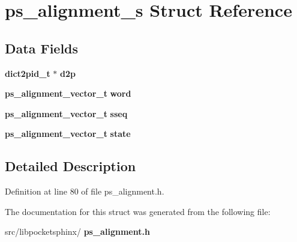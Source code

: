 \section{ps\+\_\+alignment\+\_\+s Struct Reference}
\label{structps__alignment__s}
\subsection*{Data Fields}
\begin{DoxyCompactItemize}
\item 
\mbox{\label{structps__alignment__s_a0c5367539e2ff9e5808672445c0a1303}} 
\textbf{ dict2pid\+\_\+t} $\ast$ {\bfseries d2p}
\item 
\mbox{\label{structps__alignment__s_af0a14378c50f80560198883436a84409}} 
\textbf{ ps\+\_\+alignment\+\_\+vector\+\_\+t} {\bfseries word}
\item 
\mbox{\label{structps__alignment__s_aa4b417c284b9e331431ea7a433f47e19}} 
\textbf{ ps\+\_\+alignment\+\_\+vector\+\_\+t} {\bfseries sseq}
\item 
\mbox{\label{structps__alignment__s_a1a62f5fce26879f312588de04c010538}} 
\textbf{ ps\+\_\+alignment\+\_\+vector\+\_\+t} {\bfseries state}
\end{DoxyCompactItemize}


\subsection{Detailed Description}


Definition at line 80 of file ps\+\_\+alignment.\+h.



The documentation for this struct was generated from the following file\+:\begin{DoxyCompactItemize}
\item 
src/libpocketsphinx/\textbf{ ps\+\_\+alignment.\+h}\end{DoxyCompactItemize}
